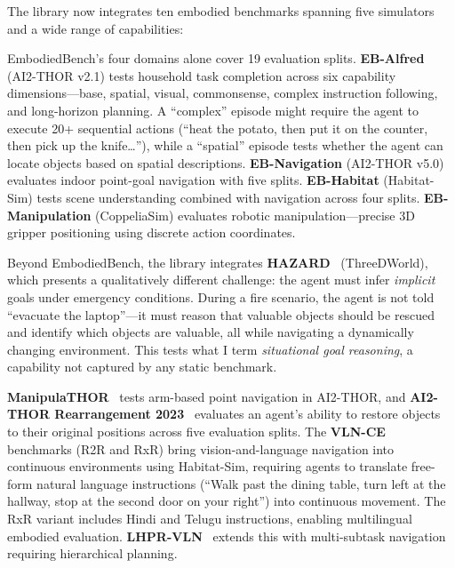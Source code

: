 \documentclass[
hf,
]{confart}
\begin{document}
The library now integrates ten embodied benchmarks spanning five simulators and a wide range of capabilities:

EmbodiedBench's four domains alone cover 19 evaluation splits. \textbf{EB-Alfred} (AI2-THOR v2.1) tests household task completion across six capability dimensions---base, spatial, visual, commonsense, complex instruction following, and long-horizon planning. A ``complex'' episode might require the agent to execute 20+ sequential actions (``heat the potato, then put it on the counter, then pick up the knife\ldots''), while a ``spatial'' episode tests whether the agent can locate objects based on spatial descriptions. \textbf{EB-Navigation} (AI2-THOR v5.0) evaluates indoor point-goal navigation with five splits. \textbf{EB-Habitat} (Habitat-Sim) tests scene understanding combined with navigation across four splits. \textbf{EB-Manipulation} (CoppeliaSim) evaluates robotic manipulation---precise 3D gripper positioning using discrete action coordinates.

Beyond EmbodiedBench, the library integrates \textbf{HAZARD}~\cite{zhou2024hazardchallengeembodieddecision} (ThreeDWorld), which presents a qualitatively different challenge: the agent must infer \textit{implicit} goals under emergency conditions. During a fire scenario, the agent is not told ``evacuate the laptop''---it must reason that valuable objects should be rescued and identify which objects are valuable, all while navigating a dynamically changing environment. This tests what I term \textit{situational goal reasoning}, a capability not captured by any static benchmark.

\textbf{ManipulaTHOR}~\cite{ehsani2021manipulathorframeworkvisualobject} tests arm-based point navigation in AI2-THOR, and \textbf{AI2-THOR Rearrangement 2023}~\cite{RoomR} evaluates an agent's ability to restore objects to their original positions across five evaluation splits. The \textbf{VLN-CE}~\cite{krantz2020navgraphvisionandlanguagenavigationcontinuous} benchmarks (R2R and RxR) bring vision-and-language navigation into continuous environments using Habitat-Sim, requiring agents to translate free-form natural language instructions (``Walk past the dining table, turn left at the hallway, stop at the second door on your right'') into continuous movement. The RxR variant includes Hindi and Telugu instructions, enabling multilingual embodied evaluation. \textbf{LHPR-VLN}~\cite{song2025longhorizonvisionlanguagenavigationplatform} extends this with multi-subtask navigation requiring hierarchical planning.
\end{document}
